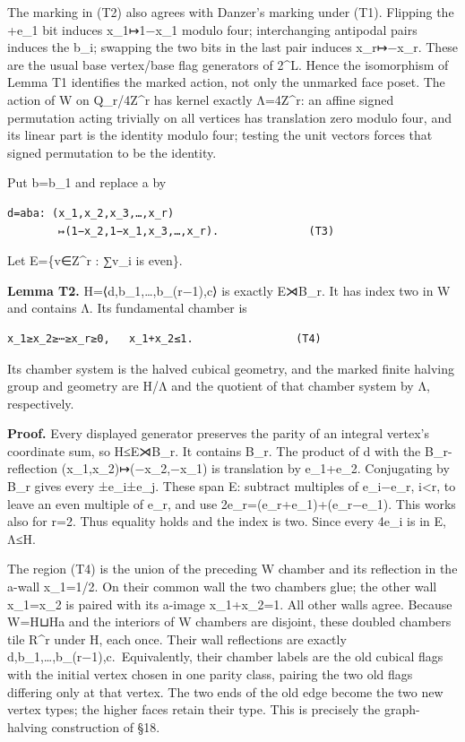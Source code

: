 \documentclass[
  10pt,
  letterpaper,
]{article}
\begin{document}
The marking in (T2) also agrees with Danzer's marking under (T1).
Flipping the +e\_1 bit induces x\_1↦1−x\_1 modulo four; interchanging
antipodal pairs induces the b\_i; swapping the two bits in the last pair
induces x\_r↦−x\_r. These are the usual base vertex/base flag generators
of 2\^{}L. Hence the isomorphism of Lemma T1 identifies the marked
action, not only the unmarked face poset. The action of W on
Q\_r/4Z\^{}r has kernel exactly Λ=4Z\^{}r: an affine signed permutation
acting trivially on all vertices has translation zero modulo four, and
its linear part is the identity modulo four; testing the unit vectors
forces that signed permutation to be the identity.

Put b=b\_1 and replace a by

\begin{verbatim}
d=aba: (x_1,x_2,x_3,…,x_r)
        ↦(1−x_2,1−x_1,x_3,…,x_r).              (T3)
\end{verbatim}

Let E=\{v∈Z\^{}r : ∑v\_i is even\}.

\textbf{Lemma T2.} H=⟨d,b\_1,\ldots,b\_(r−1),c⟩ is exactly E⋊B\_r. It
has index two in W and contains Λ. Its fundamental chamber is

\begin{verbatim}
x_1≥x_2≥⋯≥x_r≥0,   x_1+x_2≤1.                (T4)
\end{verbatim}

Its chamber system is the halved cubical geometry, and the marked finite
halving group and geometry are H/Λ and the quotient of that chamber
system by Λ, respectively.

\textbf{Proof.} Every displayed generator preserves the parity of an
integral vertex's coordinate sum, so H≤E⋊B\_r. It contains B\_r. The
product of d with the B\_r-reflection (x\_1,x\_2)↦(−x\_2,−x\_1) is
translation by e\_1+e\_2. Conjugating by B\_r gives every ±e\_i±e\_j.
These span E: subtract multiples of e\_i−e\_r, i\textless r, to leave an
even multiple of e\_r, and use 2e\_r=(e\_r+e\_1)+(e\_r−e\_1). This works
also for r=2. Thus equality holds and the index is two. Since every
4e\_i is in E, Λ≤H.

The region (T4) is the union of the preceding W chamber and its
reflection in the a-wall x\_1=1/2. On their common wall the two chambers
glue; the other wall x\_1=x\_2 is paired with its a-image x\_1+x\_2=1.
All other walls agree. Because W=H⊔Ha and the interiors of W chambers
are disjoint, these doubled chambers tile R\^{}r under H, each once.
Their wall reflections are exactly
d,b\_1,\ldots,b\_(r−1),c.~Equivalently, their chamber labels are the old
cubical flags with the initial vertex chosen in one parity class,
pairing the two old flags differing only at that vertex. The two ends of
the old edge become the two new vertex types; the higher faces retain
their type. This is precisely the graph-halving construction of §18.
\end{document}
